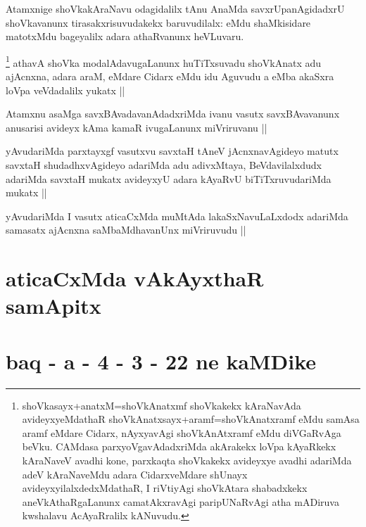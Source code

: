\begin{artha}
Atamxnige shoVkakAraNavu odagidalilx tAnu AnaMda savxrUpanAgidadxrU shoVkavanunx tirasakxrisuvudakekx baruvudilalx: eMdu shaMkisidare matotxMdu bageyalilx adara athaRvanunx heVLuvaru.
\end{artha}

\begin{artha}
\footnote{shoVkasayx+anatxM=shoVkAnatxmf shoVkakekx kAraNavAda avideyxyeMdathaR shoVkAnatxsayx+aramf=shoVkAnatxramf eMdu samAsa aramf eMdare Cidarx, nAyxyavAgi shoVkAnAtxramf eMdu diVGaRvAga beVku. CAMdasa parxyoVgavAdadxriMda akArakekx loVpa kAyaRkekx kAraNaveV avadhi kone, parxkaqta shoVkakekx avideyxye avadhi adariMda adeV kAraNaveMdu adara CidarxveMdare shUnayx avideyxyilalxdedxMdathaR, I riVtiyAgi shoVkAtara shabadxkekx aneVkAthaRgaLanunx camatAkxravAgi paripUNaRvAgi atha mADiruva kwshalavu AcAyaRralilx kANuvudu.}
athavA shoVka modalAdavugaLanunx huTiTxsuvadu shoVkAnatx adu ajAcnxna, adara araM, eMdare Cidarx eMdu idu Aguvudu a eMba akaSxra loVpa veVdadalilx yukatx ||
\end{artha}


\begin{artha}
Atamxnu asaMga savxBAvadavanAdadxriMda ivanu vasutx savxBAvavanunx anusarisi avideyx kAma kamaR ivugaLanunx miVriruvanu ||
\end{artha}


\begin{artha}
yAvudariMda parxtayxgf vasutxvu savxtaH tAneV jAcnxnavAgideyo matutx savxtaH shudadhxvAgideyo adariMda adu adivxMtaya, BeVdavilalxdudx adariMda savxtaH mukatx avideyxyU adara kAyaRvU biTiTxruvudariMda mukatx ||
\end{artha}


\begin{artha}
yAvudariMda I vasutx aticaCxMda muMtAda lakaSxNavuLaLxdodx adariMda samasatx ajAcnxna saMbaMdhavanUnx miVriruvudu ||
\end{artha}

\section*{aticaCxMda vAkAyxthaR samApitx}

\section*{baq - a - 4 - 3 - 22 ne kaMDike}

